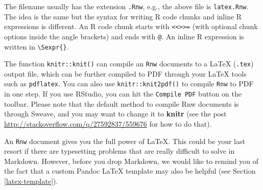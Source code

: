 \documentclass[
  11pt,
]{krantz}
\newenvironment{Shaded}{\begin{snugshade}}{\end{snugshade}}
\newcommand{\BuiltInTok}[1]{#1}
\newcommand{\ExtensionTok}[1]{#1}
\newcommand{\FunctionTok}[1]{\textcolor[rgb]{0,0,0}{#1}}
\newcommand{\KeywordTok}[1]{\textcolor[rgb]{0.27,0.27,0.27}{\textbf{#1}}}
\newcommand{\NormalTok}[1]{#1}
\newcommand{\SpecialCharTok}[1]{\textcolor[rgb]{0,0,0}{#1}}
\newcommand{\SpecialStringTok}[1]{\textcolor[rgb]{0.5,0.5,0.5}{#1}}
\begin{document}
\begin{Shaded}
\end{Shaded}

The filename usually has the extension \texttt{.Rnw}, e.g., the above file is \texttt{latex.Rnw}. The idea is the same but the syntax for writing R code chunks and inline R expressions is different. An R code chunk starts with \texttt{\textless{}\textless{}\textgreater{}\textgreater{}=} (with optional chunk options inside the angle brackets) and ends with \texttt{@}. An inline R expression is written in \texttt{\textbackslash{}Sexpr\{\}}.

The function \texttt{knitr::knit()} can compile an \texttt{Rnw} documents to a LaTeX (\texttt{.tex}) output file, which can be further compiled to PDF through your LaTeX tools such as \texttt{pdflatex}. You can also use \texttt{knitr::knit2pdf()} to compile \texttt{Rnw} to PDF in one step. If you use RStudio, you can hit the \texttt{Compile\ PDF} button on the toolbar. Please note that the default method to compile Rnw documents is through Sweave, and you may want to change it to \textbf{knitr} (see the post \url{http://stackoverflow.com/q/27592837/559676} for how to do that).

An \texttt{Rnw} document gives you the full power of LaTeX. This could be your last resort if there are typesetting problems that are really difficult to solve in Markdown. However, before you drop Markdown, we would like to remind you of the fact that a custom Pandoc LaTeX template may also be helpful (see Section \ref{latex-template}).
\end{document}
